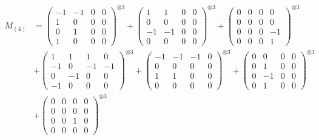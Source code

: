 \documentclass{article}
\newcommand{\Mthree}{%
    M_{(4)}
}
\begin{document}
        \newpage
        
        \footnotesize{
        \begin{align}
        \Mthree
        &= \label{Rs16-Rc11-Solution-11-c1} \begin{pmatrix} -1 & -1 & 0 & 0 \\ 1 & 0 & 0 & 0 \\ 0 & 1 & 0 & 0 \\ 1 & 0 & 0 & 0 \end{pmatrix}^{\otimes 3} 
            + \begin{pmatrix} 1 & 1 & 0 & 0 \\ 0 & 0 & 0 & 0 \\ -1 & -1 & 0 & 0 \\ 0 & 0 & 0 & 0 \end{pmatrix}^{\otimes 3} 
            + \begin{pmatrix} 0 & 0 & 0 & 0 \\ 0 & 0 & 0 & 0 \\ 0 & 0 & 0 & -1 \\ 0 & 0 & 0 & 1 \end{pmatrix}^{\otimes 3} \\
        &+ \label{Rs16-Rc11-Solution-11-c4} \begin{pmatrix} 1 & 1 & 1 & 0 \\ -1 & 0 & -1 & -1 \\ 0 & -1 & 0 & 0 \\ -1 & 0 & 0 & 0 \end{pmatrix}^{\otimes 3} 
            + \begin{pmatrix} -1 & -1 & -1 & 0 \\ 0 & 0 & 0 & 0 \\ 1 & 1 & 0 & 0 \\ 0 & 0 & 0 & 0 \end{pmatrix}^{\otimes 3} 
            + \begin{pmatrix} 0 & 0 & 0 & 0 \\ 0 & 1 & 0 & 0 \\ 0 & -1 & 0 & 0 \\ 0 & 1 & 0 & 0 \end{pmatrix}^{\otimes 3} \\
        &+ \label{Rs16-Rc11-Solution-11-c7} \begin{pmatrix} 0 & 0 & 0 & 0 \\ 0 & 0 & 0 & 0 \\ 0 & 0 & 1 & 0 \\ 0 & 0 & 0 & 0 \end{pmatrix}^{\otimes 3} 

\end{align}}
\end{document}
